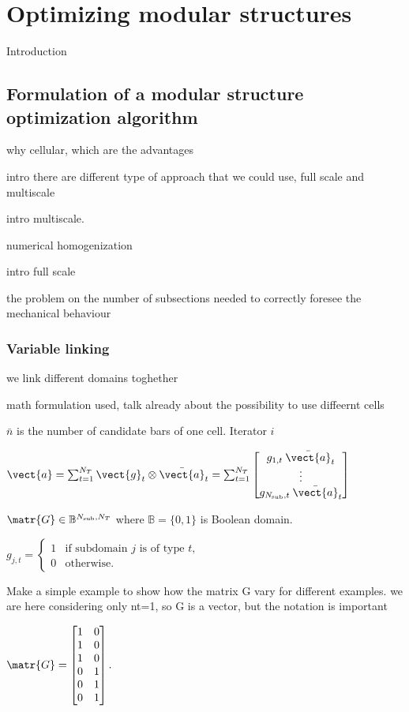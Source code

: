 \setchapterpreamble[u]{\margintoc}
\chapter{Optimizing modular structures}
Introduction
\section{Formulation of a modular structure optimization algorithm}
why cellular, which are the advantages

intro there are different type of approach that we could use, full scale and multiscale

intro multiscale.

numerical homogenization

intro full scale

the problem on the number of subsections needed to correctly foresee the mechanical behaviour
\subsection{Variable linking}
we link different domains toghether

math formulation used, talk already about the possibility to use diffeernt cells

$\bar{n}$ is the number of candidate bars of one cell. Iterator $i$


$\vect{a} = \sum_{t=1}^{N_T} \vect{g}_t\otimes\bar{\vect{a}}_t = \sum_{t=1}^{N_T} \begin{bmatrix}
    g_{1,t} \: \bar{\vect{a}}_t \\
    \vdots\\
    g_{N_{\text{sub}},t} \: \bar{\vect{a}}_t 
    \end{bmatrix}$

$\matr{G} \in \mathbb{B}^{N_{\text{sub}},N_T} $
where $\mathbb{B}=\lbrace 0,1 \rbrace$ is Boolean domain.

$g_{j,t} =
\begin{cases}
  1 & \text{if subdomain $j$ is of type $t$,} \\
  0 & \text{otherwise.} 
\end{cases}$

Make a simple example to show how the matrix G vary for different examples. we are here considering only nt=1, so G is a vector, but the notation is important

$\matr{G}=
\begin{bmatrix} 
    1 & 0 \\
    1 & 0 \\
    1 & 0 \\
    0 & 1 \\
    0 & 1 \\
    0 & 1 \\
\end{bmatrix}.$

